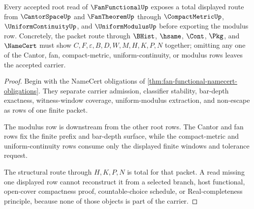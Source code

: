 \begin{theorem}\label{thm:fan-functional-root-modulus-row-totality}
Every accepted root read of $\FanFunctionalUp$ exposes a total displayed route from $\CantorSpaceUp$ and $\FanTheoremUp$ through $\CompactMetricUp$, $\UniformContinuityUp$, and $\UniformModulusUp$ before exporting the modulus row. Concretely, the packet route through $\BHist$, $\hsame$, $\Cont$, $\Pkg$, and $\NameCert$ must show $C,F,\varepsilon,B,D,W,M,H,K,P,N$ together; omitting any one of the Cantor, fan, compact-metric, uniform-continuity, or modulus rows leaves the accepted carrier.
\end{theorem}
\begin{proof}
Begin with the NameCert obligations of \autoref{thm:fan-functional-namecert-obligations}. They separate carrier admission, classifier stability, bar-depth exactness, witness-window coverage, uniform-modulus extraction, and non-escape as rows of one finite packet.

The modulus row is downstream from the other root rows. The Cantor and fan rows fix the finite prefix and bar-depth surface, while the compact-metric and uniform-continuity rows consume only the displayed finite windows and tolerance request.

The structural route through $H,K,P,N$ is total for that packet. A read missing one displayed row cannot reconstruct it from a selected branch, host functional, open-cover compactness proof, countable-choice schedule, or Real-completeness principle, because none of those objects is part of the carrier.
\end{proof}

